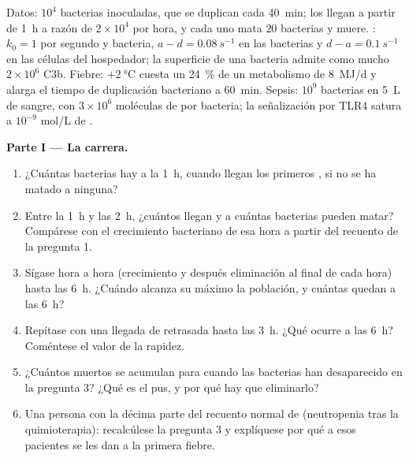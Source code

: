 \begin{problem}
\label{pb:b3:innate-immunity:1}
Datos: $10^{4}$ bacterias inoculadas, que se duplican cada \qty{40}{min};
los  llegan a partir de \qty{1}{h} a razón de $2\times 10^{4}$
por hora, y cada uno mata $20$ bacterias y muere. :
$k_{0} = 1$ por segundo y bacteria, $a - d = \qty{0.08}{s^{-1}}$ en las
bacterias y $d - a =
\qty{0.1}{s^{-1}}$ en las células del hospedador; la
superficie de una bacteria admite como mucho $2\times 10^{6}$ C3b.
Fiebre: $+\qty{2}{\celsius}$ cuesta un \qty{24}{\%} de un metabolismo de
\qty{8}{MJ/d} y alarga el tiempo de duplicación bacteriano a
\qty{60}{min}. Sepsis: $10^{9}$ bacterias en \qty{5}{L} de sangre, con
$3\times 10^{6}$ moléculas de  por bacteria; la
señalización por TLR4 satura a $10^{-9}$ mol/L de .

\medskip
\noindent\textbf{Parte I --- La carrera.}
\begin{enumerate}
  \item ¿Cuántas bacterias hay a la \qty{1}{h}, cuando llegan los
        primeros , si no se ha matado a ninguna?
  \item Entre la \qty{1}{h} y las \qty{2}{h}, ¿cuántos  llegan
        y a cuántas bacterias pueden matar? Compárese con el crecimiento
        bacteriano de esa hora a partir del recuento de la pregunta 1.
  \item Sígase hora a hora (crecimiento y después eliminación al final de
        cada hora) hasta las \qty{6}{h}. ¿Cuándo alcanza su máximo la
        población, y cuántas quedan a las \qty{6}{h}?
  \item Repítase con una llegada de  retrasada hasta las
        \qty{3}{h}. ¿Qué ocurre a las \qty{6}{h}? Coméntese el valor de
        la rapidez.
  \item ¿Cuántos  muertos se acumulan para cuando las
        bacterias han desaparecido en la pregunta 3? ¿Qué es el pus, y
        por qué hay que eliminarlo?
  \item Una persona con la décima parte del recuento normal de
         (neutropenia tras la quimioterapia): recalcúlese la
        pregunta 3 y explíquese por qué a esos pacientes se les dan
         a la primera fiebre.
\end{enumerate}


\end{problem}
